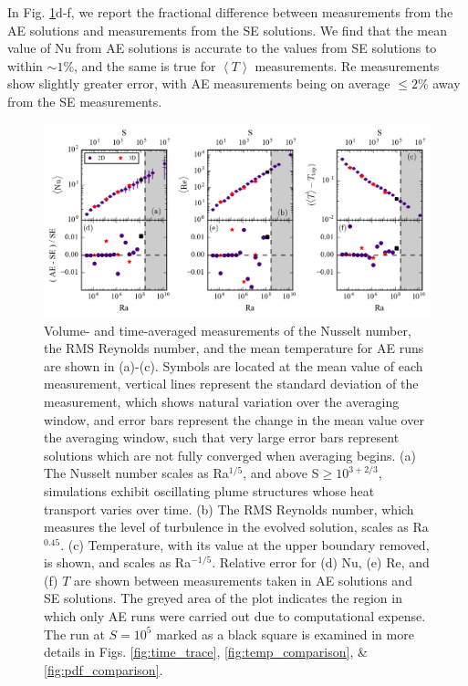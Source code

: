 \documentclass[aps, pre, onecolumn, nofootinbib, notitlepage, groupedaddress, amsfonts, amssymb, amsmath, longbibliography]{revtex4-1}
\newcommand{\angles}[1]{\ensuremath{\left\langle #1 \right\rangle}}
\begin{document}
In Fig. \ref{fig:parameter_space_comparison}d-f, we report the fractional difference
between measurements from the AE solutions and measurements from the SE solutions.
We find that the mean value of Nu from AE solutions is accurate to the values
from SE solutions to within $\sim 1$\%, and the same is true for $\angles{T}$ measurements.
Re measurements show slightly greater error, with AE measurements being on average
$\leq 2$\% away from the SE measurements. 

\begin{figure}[t]
\includegraphics[width=\textwidth]{./figs/parameter_space_comparison.png}
\caption{Volume- and time-averaged measurements of the Nusselt number, the
RMS Reynolds number, and the mean temperature for AE runs are shown in (a)-(c).
Symbols are located at the mean value of
each measurement, vertical lines represent the standard deviation of the measurement,
which shows natural variation over the
averaging window, and error bars represent the change in the mean value over the averaging window,
such that very large error bars represent solutions which are not fully converged when averaging
begins.
(a) The Nusselt number scales as Ra$^{1/5}$, and above S$\geq 10^{3+2/3}$,
simulations exhibit oscillating plume structures whose heat transport varies over time.  
(b) The RMS Reynolds number, which measures the level of turbulence in the evolved solution, scales as
Ra$^{0.45}$. (c) Temperature, with its value at the upper boundary removed, is shown,
and scales as Ra$^{-1/5}$.
Relative error for (d) Nu, (e) Re, and (f) $T$ are shown between measurements 
taken in AE solutions and SE solutions.
The greyed area of the plot indicates the region in which only AE runs were
carried out due to computational expense. The run at $S = 10^5$ marked as a
black square is examined in more details in Figs. \ref{fig:time_trace},
\ref{fig:temp_comparison}, \& \ref{fig:pdf_comparison}.
\label{fig:parameter_space_comparison} }
\end{figure}
\end{document}
